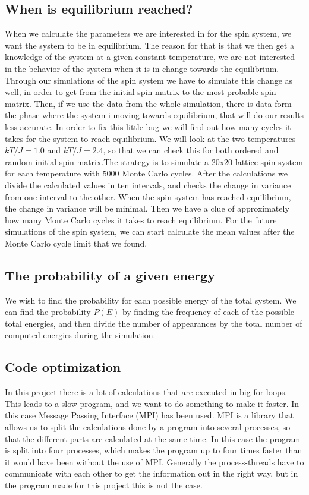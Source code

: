 \documentclass[12pt]{article}
\begin{document}
\begin{flushleft}
\subsection{When is equilibrium reached?}
When we calculate the parameters we are interested in for the spin system, we want the system to be in equilibrium. The reason for that is that we then get a knowledge of the system at a given constant temperature, we are not interested in the behavior of the system when it is in change towards the equilibrium. Through our simulations of the spin system we have to simulate this change as well, in order to get from the initial spin matrix to the most probable spin matrix. Then, if we use the data from the whole simulation, there is data form the phase where the system i moving towards equilibrium, that will do our results less accurate. In order to fix this little bug we will find out how many cycles it takes for the system to reach equilibrium. We will look at the two temperatures $kT/J = 1.0$ and $kT/J = 2.4$, so that we can check this for both ordered and random initial spin matrix.The strategy is to simulate a 20x20-lattice spin system for each temperature with $5000$ Monte Carlo cycles. After the calculations we divide the calculated values in ten intervals, and checks the change in variance from one interval to the other. When the spin system has reached equilibrium, the change in variance will be minimal. Then we have a clue of approximately how many Monte Carlo cycles it takes to reach equilibrium. For the future simulations of the spin system, we can start calculate the mean values after the Monte Carlo cycle limit that we found. 

\subsection{The probability of a given energy}
We wish to find the probability for each possible energy of the total system. We can find the probability $P(E)$ by finding the frequency of each of the possible total energies, and then divide the number of appearances by the total number of computed energies during the simulation. 

\subsection{Code optimization}
In this project there is a lot of calculations that are executed in big for-loops. This leads to a slow program, and we want to do something to make it faster. In this case Message Passing Interface (MPI) has been used.  MPI is a library that allows us to split the calculations done by a program into several processes, so that the different parts are calculated at the same time. In this case the program is split into four processes, which makes the program up to four times faster than it would have been without the use of MPI. Generally the process-threads have to communicate with each other to get the information out in the right way, but in the program made for this project this is not the case.   


\end{flushleft}
\end{document}
